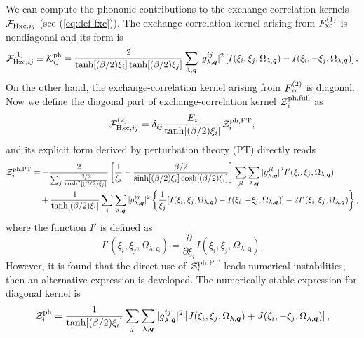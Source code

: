 We can compute the phononic contributions to the exchange-correlation kernels ${\mathcal F}_{{\rm Hxc},ij}$
(see (\ref{eq:def-fxc})).
The exchange-correlation kernel arising from $F^{(1)}_{\rm xc}$ is nondiagonal and its form is
%
\begin{equation}
	{\mathcal F}^{(1)}_{{\rm Hxc},ij}
	\equiv{\mathcal K}^{\rm ph}_{ij} = \frac{2}{\tanh[(\beta/2)\xi_i]\tanh[(\beta/2)\xi_j]}
	\sum_{\lambda, \bm q} |g^{ij}_{\lambda, \bm q}|^2
	\left[
		I(\xi_i, \xi_j, \Omega_{\lambda, \bm q}) - I(\xi_i, -\xi_j, \Omega_{\lambda, \bm q})
	\right].
	\label{eq:Kph}
\end{equation}
%
On the other hand, the exchange-correlation kernel arising from $F^{(2)}_{\rm xc}$ is diagonal.
Now we define the diagonal part of exchange-correlation kernel ${\mathcal Z}^{\rm ph, full}_i$ as
%
\begin{equation}
	{\mathcal F}^{(2)}_{{\rm Hxc},ij} = \delta_{ij}
	\frac{E_i}{\tanh[(\beta/2)\xi_i]}{\mathcal Z}^{\rm ph,PT}_i,
	\label{eq:FxcZphPT}
\end{equation}
and its explicit form derived by perturbation theory (PT) directly reads
%
\begin{equation}
\begin{split}
	\label{eq:ZphPT}
	{\mathcal Z}^{\rm ph, PT}_i &= - \frac{2}{\sum_{j} \frac{\beta/2}{\cosh^2[(\beta/2)\xi_j]}}
	\left[
		\frac{1}{\xi_i} - \frac{\beta/2}{\sinh[(\beta/2)\xi_i]\cosh[(\beta/2)\xi_i]}
	\right]
	\sum_{jl}\sum_{\lambda, \bm q} |g^{jl}_{\lambda, \bm q}|^2 I'(\xi_i, \xi_j, \Omega_{\lambda, \bm q}) \\
	&\quad + \frac{1}{\tanh[(\beta/2)\xi_i]}
	\sum_{j}\sum_{\lambda, \bm q} |g^{ij}_{\lambda, \bm q}|^2
	\left\{
		\frac{1}{\xi_j} [I(\xi_i, \xi_j, \Omega_{\lambda, \bm q}) - I(\xi_i, -\xi_j, \Omega_{\lambda, \bm q})]
		- 2I'(\xi_i, \xi_j, \Omega_{\lambda, \bm q})
	\right\},
\end{split}
\end{equation}
%
where the function $I'$ is defined as
%
\begin{equation}
	I'(\xi_i, \xi_j, \Omega_{\lambda, \bm q}) = 
	\frac{\partial}{\partial \xi_i} I(\xi_i, \xi_j, \Omega_{\lambda, \bm q}).
	\label{eq:Iprime}
\end{equation}
%
However, it is found that the direct use of ${\mathcal Z}^{\rm ph, PT}_i$ leads numerical instabilities\cite{Luders2005},
then an alternative expression is developed. The numerically-stable expression for diagonal kernel is 
%
\begin{equation}
	{\mathcal Z}^{\rm ph}_i = \frac{1}{\tanh[(\beta/2)\xi_i]}
	\sum_{j}\sum_{\lambda, \bm q} |g^{ij}_{\lambda, \bm q}|^2
	\left[
		J(\xi_i, \xi_j, \Omega_{\lambda, \bm q}) +
		J(\xi_i, -\xi_j, \Omega_{\lambda, \bm q})
	\right],
	\label{eq:Zphprac}
\end{equation}
